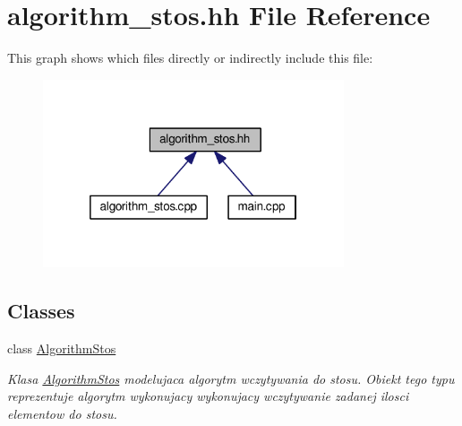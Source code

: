 \hypertarget{algorithm__stos_8hh}{\section{algorithm\-\_\-stos.\-hh File Reference}
\label{algorithm__stos_8hh}
}
This graph shows which files directly or indirectly include this file\-:\nopagebreak
\begin{figure}[H]
\begin{center}
\leavevmode
\includegraphics[width=252pt]{algorithm__stos_8hh__dep__incl}
\end{center}
\end{figure}
\subsection*{Classes}
\begin{DoxyCompactItemize}
\item 
class \hyperlink{class_algorithm_stos}{Algorithm\-Stos}
\begin{DoxyCompactList}\small\item\em Klasa \hyperlink{class_algorithm_stos}{Algorithm\-Stos} modelujaca algorytm wczytywania do stosu. Obiekt tego typu reprezentuje algorytm wykonujacy wykonujacy wczytywanie zadanej ilosci elementow do stosu. \end{DoxyCompactList}\end{DoxyCompactItemize}
